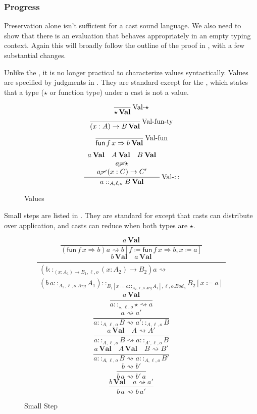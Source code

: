  
\subsubsection{Progress}
 
Preservation alone isn't sufficient for a cast sound language.
We also need to show that there is an evaluation that behaves appropriately in an empty typing context.
Again this will broadly follow the outline of the \slang{} proof in , with a few substantial changes.
 
Unlike the \slang{}, it is no longer practical to characterize values syntactically.
Values are specified by judgments in .
They are standard except for the , which states that a type ($\star$ or function type) under a cast is not a value.
 
\begin{figure}
\[
\frac{\,}{\star\,\textbf{Val}}
\operatorname{Val-\star}
\]
\[
\frac{\,}{\left(x:A\right)\rightarrow B\,\textbf{Val}}
\operatorname{Val-fun-ty}
\]
\[
\frac{\,}{\mathsf{fun}\,f\,x\Rightarrow b\:\textbf{Val}}
\operatorname{Val-fun}
\]
\[
\frac{\begin{array}{c}
a\:\textbf{Val}\quad A\:\textbf{Val}\quad B\:\textbf{Val}\\
a\cancel{=}\star\\
a\cancel{=}\left(x:C\right)\rightarrow C'
\end{array}}{a::_{A,\ell, o}B\:\textbf{Val}}
\operatorname{Val-::}
\]
\caption{\CLang{} Values}
\label{fig:cast-val}
\end{figure}
 
Small steps are listed in .
They are standard for \cbv{} except that casts can distribute over application, and casts can reduce when both types are $\star$.
 
\begin{figure}
\[
\frac{a\,\textbf{Val}}{\left(\mathsf{fun}\,f\,x\Rightarrow b\right)a\rightsquigarrow b\left[f\coloneqq\mathsf{fun}\,f\,x\Rightarrow b,x\coloneqq a\right]}
\]
\[
\frac{b\,\textbf{Val}\quad a\,\textbf{Val}}{\begin{array}{c}
\left(b::_{\left(x:A_{1}\right)\rightarrow B_{1},\ell ,o}\left(x:A_{2}\right)\rightarrow B_{2}\right)a\rightsquigarrow\\
\left(b\,a::_{A_{2},\ell,o.Arg}A_{1}\right)::_{B_{1}\left[x\coloneqq a::_{A_{2},\ell,o.Arg}A_{1}\right],\ell ,o.Bod_a}B_{2}\left[x\coloneqq a\right]
\end{array}}
\]
\[
\frac{a\,\textbf{Val}}{a::_{\star,\ell ,o}\star\rightsquigarrow a}
\]
\[
\frac{a\rightsquigarrow a'}{a::_{A,\ell ,o}B\rightsquigarrow a'::_{A,\ell ,o}B}
\]
\[
\frac{a\,\textbf{Val}\quad A\rightsquigarrow A'}{a::_{A,\ell ,o}B\rightsquigarrow a::_{A',\ell ,o}B}
\]
\[
\frac{a\,\textbf{Val}\quad A\,\textbf{Val}\quad B\rightsquigarrow B'}{a::_{A,\ell ,o}B\rightsquigarrow a::_{A,\ell ,o}B'}
\]
\[
\frac{b\rightsquigarrow b'}{b\,a\rightsquigarrow b'\,a}
\]
\[
\frac{b\,\textbf{Val}\quad a\rightsquigarrow a'}{b\,a\rightsquigarrow b\,a'}
\]
 
\caption{\CLang{} Small Step}
\label{fig:cast-step}
\end{figure}
 
